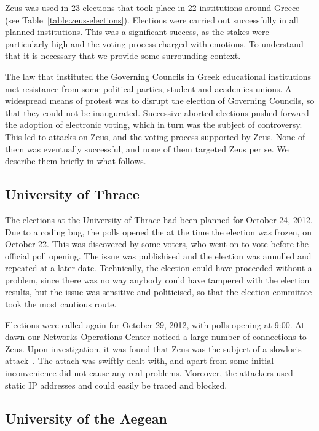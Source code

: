 \documentclass[letterpaper,twocolumn,10pt]{article}
\begin{document}
Zeus was used in 23 elections that took place in 22 institutions
around Greece (see Table~\ref{table:zeus-elections}). Elections were
carried out successfully in all planned institutions. This was a
significant success, as the stakes were particularly high and the
voting process charged with emotions. To understand that it is
necessary that we provide some surrounding context.

The law that instituted the Governing Councils in Greek educational
institutions met resistance from some political parties, student and
academics unions. A widespread means of protest was to disrupt the
election of Governing Councils, so that they could not be inaugurated.
Successive aborted elections pushed forward the adoption of electronic
voting, which in turn was the subject of controversy. This led to
attacks on Zeus, and the voting process supported by Zeus. None of
them was eventually successful, and none of them targeted Zeus per se.
We describe them briefly in what follows.

\subsection{University of Thrace}

The elections at the University of Thrace had been planned for October
24, 2012. Due to a coding bug, the polls opened the at the time the
election was frozen, on October 22. This was discovered by some
voters, who went on to vote before the official poll opening. The
issue was publishised and the election was annulled and repeated at a
later date. Technically, the election could have proceeded without a
problem, since there was no way anybody could have tampered with the
election results, but the issue was sensitive and politicised, so that
the election committee took the most cautious route.

Elections were called again for October 29, 2012, with polls opening
at 9:00. At dawn our Networks Operations Center noticed a large number
of connections to Zeus. Upon investigation, it was found that Zeus was
the subject of a slowloris attack~\cite{slowloris}. The attach was
swiftly dealt with, and apart from some initial inconvenience did not
cause any real problems. Moreover, the attackers used static IP
addresses and could easily be traced and blocked.

\subsection{University of the Aegean}
\end{document}
